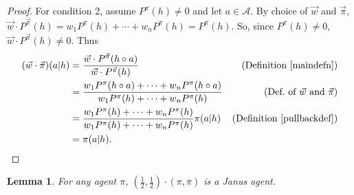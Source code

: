 \documentclass[twoside]{article}
\newtheorem{lemma}[theorem]{Lemma}
\begin{document}
\begin{proof}
        For condition 2,
        assume $P^\pi(h)\not=0$ and let $a\in\mathcal A$.
        By choice of $\vec w$ and $\vec\pi$,
        $\vec w\cdot{P^{\vec\pi}}(h)=w_1P^\pi(h)+\cdots+w_nP^\pi(h)=P^\pi(h)$.
        So, since $P^\pi(h)\not=0$, $\vec w\cdot{P^{\vec\pi}}(h)\not=0$.
        Thus
        \begin{align*}
            (\vec w\cdot\vec\pi)(a|h)
                &= \frac{\vec w\cdot {P^{\vec\pi}}(h\circ a)}{\vec w\cdot{P^{\vec\pi}}(h)}
                    &\mbox{(Definition \ref{maindefn})}\\
                &= \frac{w_1P^\pi(h\circ a)+\cdots+w_nP^\pi(h\circ a)}
                    {w_1P^\pi(h)+\cdots+w_nP^\pi(h)}
                    &\mbox{(Def.\ of $\vec w$ and $\vec\pi$)}\\
                &= \frac{w_1P^\pi(h)+\cdots+w_nP^\pi(h)}{w_1P^\pi(h)+\cdots+w_nP^\pi(h)}
                    \pi(a|h)
                    &\mbox{(Definition \ref{pullbackdef})}\\
                &= \pi(a|h).
        \end{align*}
\end{proof}

\begin{lemma}
\label{reflectionmakesjanuslemma}
    For any agent $\pi$,
    $(\frac12,\frac12)\cdot(\pi,\overline\pi)$ is a Janus agent.
\end{lemma}
\end{document}
